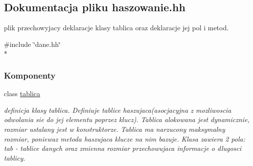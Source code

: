 \hypertarget{haszowanie_8hh}{}\subsection{Dokumentacja pliku haszowanie.\+hh}
\label{haszowanie_8hh}


plik przechowyjacy deklaracje klasy tablica oraz deklaracje jej pol i metod.  


{\ttfamily \#include \char`\"{}dane.\+hh\char`\"{}}\\*
\subsubsection*{Komponenty}
\begin{DoxyCompactItemize}
\item 
class \hyperlink{classtablica}{tablica}
\begin{DoxyCompactList}\small\item\em definicja klasy tablica. Definiuje tablice haszujaca(asocjacyjna z mozliwoscia odwolania sie do jej elementu poprzez klucz). Tablica alokowana jest dynamicznie, rozmiar ustalany jest w konstruktorze. Tablica ma narzucony maksymalny rozmiar, poniewaz metoda haszujaca klucze na nim bazuje. Klasa zawiera 2 pola\+: tab -\/ tablice danych oraz zmienna rozmiar przechowujaca informacje o dlugosci tablicy. \end{DoxyCompactList}\end{DoxyCompactItemize}
